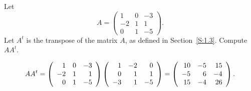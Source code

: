 \documentclass{ximera}
\begin{document}
\begin{exercise} \label{c4.6.3}
Let
\[
A = \left(\begin{array}{rrr} 1 & 0 & -3\\ -2 & 1 & 1 \\ 0 & 1 & -5 \end{array}
\right).
\]
Let $A^t$ is the transpose of the matrix $A$, as defined in
Section~\ref{S:1.3}. Compute $AA^t$.

\begin{solution}

\[ AA^t = \left(\begin{array}{rrr} 1 & 0 & -3 \\ -2 & 1 & 1 \\ 0 & 1 & -5\end{array}\right)
\left(\begin{array}{rrr} 1 & -2 & 0 \\ 0 & 1 & 1 \\ -3 & 1 & -5\end{array}\right) =
\left(\begin{array}{rrr} 10 & -5 & 15 \\ -5 & 6 & -4 \\ 15 & -4 & 26\end{array}\right). \]



\end{solution}
\end{exercise}
\end{document}
